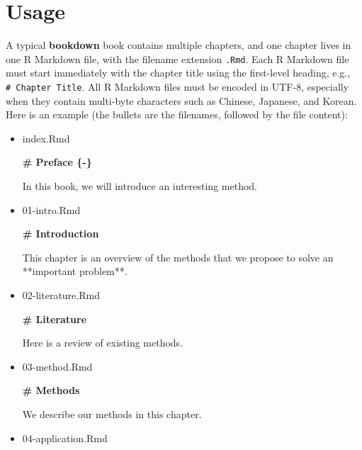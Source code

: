 \documentclass[
  12pt,
]{krantz}
\newenvironment{Shaded}{\begin{snugshade}}{\end{snugshade}}
\newcommand{\FunctionTok}[1]{\textcolor[rgb]{0.13,0.29,0.53}{\textbf{#1}}}
\newcommand{\NormalTok}[1]{#1}
\theoremstyle{definition}
\theoremstyle{definition}
\theoremstyle{definition}
\theoremstyle{definition}
\theoremstyle{remark}
\begin{document}
\section{Usage}\label{usage}

A typical \textbf{bookdown} book contains multiple chapters, and one chapter lives in one R Markdown file, with the filename extension \texttt{.Rmd}. Each R Markdown file must start immediately with the chapter title using the first-level heading, e.g., \texttt{\#\ Chapter\ Title}. All R Markdown files must be encoded in UTF-8, especially when they contain multi-byte characters such as Chinese, Japanese, and Korean. Here is an example (the bullets are the filenames, followed by the file content):

\begin{itemize}
\item
  index.Rmd

\begin{Shaded}
\begin{Highlighting}[]
\FunctionTok{\# Preface \{{-}\}}

\NormalTok{In this book, we will introduce an interesting}
\NormalTok{method.}
\end{Highlighting}
\end{Shaded}
\item
  01-intro.Rmd

\begin{Shaded}
\begin{Highlighting}[]
\FunctionTok{\# Introduction}

\NormalTok{This chapter is an overview of the methods that}
\NormalTok{we propose to solve an **important problem**.}
\end{Highlighting}
\end{Shaded}
\item
  02-literature.Rmd

\begin{Shaded}
\begin{Highlighting}[]
\FunctionTok{\# Literature}

\NormalTok{Here is a review of existing methods.}
\end{Highlighting}
\end{Shaded}
\item
  03-method.Rmd

\begin{Shaded}
\begin{Highlighting}[]
\FunctionTok{\# Methods}

\NormalTok{We describe our methods in this chapter.}
\end{Highlighting}
\end{Shaded}
\item
  04-application.Rmd


\end{itemize}
\end{document}
